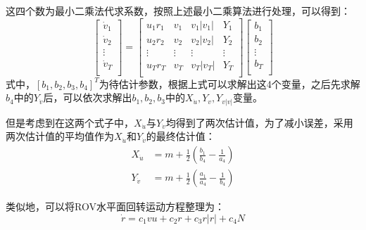 这四个数为最小二乘法代求系数，按照上述最小二乘算法进行处理，可以得到：
\begin{equation}
    \begin{bmatrix}
    \dot{v}_1 \\
    \dot{v}_2 \\
    \vdots \\
    \dot{v}_T \\
    \end{bmatrix}
    =
    \begin{bmatrix}
    u_1r_1 & v_1 & v_1|v_1| & Y_1 \\
    u_2r_2 & v_2 & v_2|v_2| & Y_2 \\
    \vdots & \vdots & \vdots & \vdots \\
    u_Tr_T & v_T & v_T|v_T| & Y_T \\
    \end{bmatrix}
    \begin{bmatrix}
    b_1 \\
    b_2 \\
    \vdots \\
    b_T \\
    \end{bmatrix}
\end{equation}
式中，$[b_1,b_2,b_3,b_4]^T$为待估计参数，根据上式可以求解出这4个变量，之后先求解$b_4$中的$Y_{\dot{v}}$后，可以依次求解出$b_1,b_2,b_3$中的$X_{\dot{u}},Y_v,Y_{v|v| }$变量。

但是考虑到在这两个式子中，$X_{\dot{u}}$与$Y_{\dot{v}}$均得到了两次估计值，为了减小误差，采用两次估计值的平均值作为$X_{\dot{u}}$和$Y_{\dot{v}}$的最终估计值：
\begin{equation}
    \begin{aligned}
        X_{\dot{u}} & =m + \frac{1}{2}\left(\frac{b_1}{b_4}-\frac{1}{a_4}\right)\\
        Y_{\dot{v}}& =m + \frac{1}{2}\left(\frac{a_1}{a_4}-\frac{1}{b_4}\right)
    \end{aligned}
\end{equation}


类似地，可以将ROV水平面回转运动方程整理为：
\begin{equation}
    \dot{r}=c_1vu+c_2r+c_3r|r|+c_4N
\end{equation}

